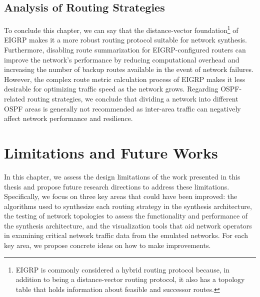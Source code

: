 \documentclass{uiucthesis2021}
\begin{document}
\section{Analysis of Routing Strategies}
\noindent To conclude this chapter, we can say that the distance-vector foundation\footnote{EIGRP is commonly considered a hybrid routing protocol because, in addition to being a distance-vector routing protocol, it also has a topology table that holds information about feasible and successor routes.} of EIGRP makes it a more robust routing protocol suitable for network synthesis. Furthermore, disabling route summarization for EIGRP-configured routers can improve the network's performance by reducing computational overhead and increasing the number of backup routes available in the event of network failures. However, the complex route metric calculation process of EIGRP makes it less desirable for optimizing traffic speed as the network grows. Regarding OSPF-related routing strategies, we conclude that dividing a network into different OSPF areas is generally not recommended as inter-area traffic can negatively affect network performance and resilience.\\


\chapter{Limitations and Future Works}
\label{c5}
\noindent In this chapter, we assess the design limitations of the work presented in this thesis and propose future research directions to address these limitations. Specifically, we focus on three key areas that could have been improved: the algorithms used to synthesize each routing strategy in the synthesis architecture, the testing of network topologies to assess the functionality and performance of the synthesis architecture, and the visualization tools that aid network operators in examining critical network traffic data from the emulated networks. For each key area, we propose concrete ideas on how to make improvements.
\end{document}
